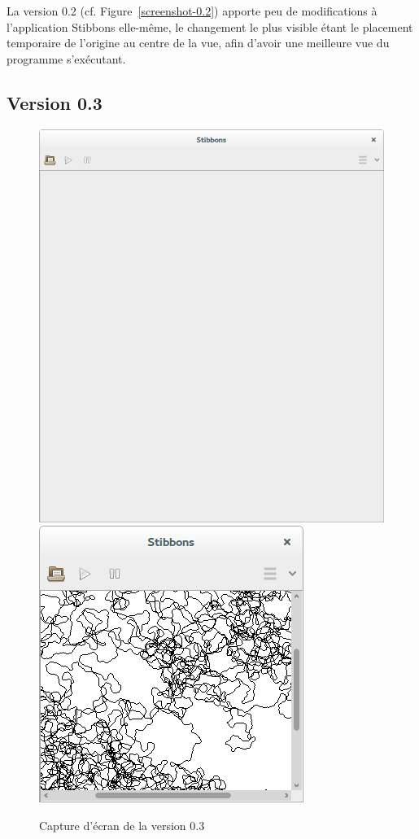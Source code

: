 La version 0.2 (cf. Figure~\ref{screenshot-0.2}) apporte peu de modifications à l'application Stibbons elle-même, le changement le plus visible étant le placement temporaire de l'origine au centre de la vue, afin d'avoir une meilleure vue du programme s'exécutant.

\subsection{Version 0.3}

\begin{figure}[h]
\centering
\includegraphics[scale=0.25]{doc/report/screenshot/stibbons-0-3-1.png}
\includegraphics[scale=0.25]{doc/report/screenshot/stibbons-0-3-3.png}
\caption{\label{screenshot-0.3} Capture d'écran de la version 0.3}
\end{figure}

